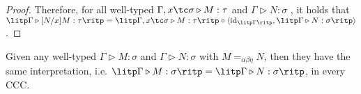 \begin{proof}
Therefore, for all well-typed $ \Gamma , x \tc \sigma \triangleright M: \tau $ and $ \Gamma \triangleright N: \sigma $ , it holds that $ \litp \Gamma \triangleright [N/x]M: \tau \ritp = \litp \Gamma , x \tc \sigma \triangleright M: \tau \ritp \circ \langle \textnormal{id}_{\litp \Gamma \ritp} , \litp \Gamma \triangleright N: \sigma \ritp \rangle $.

\end{proof}

\begin{theorem}
\label{theorem:soundness}
Given any well-typed $ \Gamma \triangleright M: \sigma $ and $ \Gamma \triangleright N: \sigma $ with $ M =_{\alpha \beta \eta} N $, then they have the same interpretation, i.e. $ \litp \Gamma \triangleright M: \sigma \ritp = \litp \Gamma \triangleright N: \sigma \ritp $, in every CCC.
\end{theorem}

